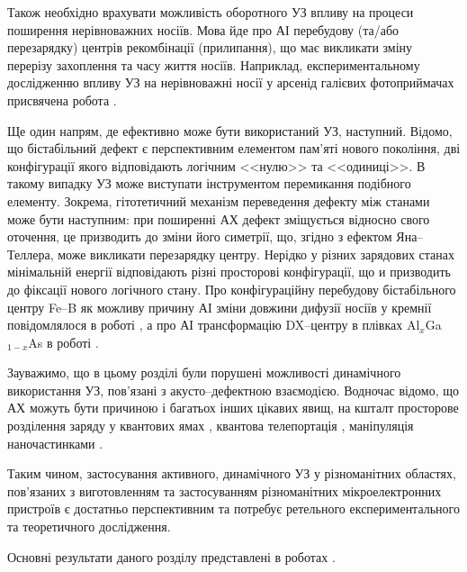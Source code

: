 Також необхідно врахувати можливість оборотного УЗ впливу на процеси поширення нерівноважних носіїв.
Мова йде про АІ перебудову (та/або перезарядку)  центрів рекомбінації (прилипання), що має викликати зміну перерізу захоплення та часу життя носіїв.
Наприклад, експериментальному дослідженню впливу УЗ на нерівноважні носії у арсенід галієвих фотоприймачах присвячена робота \cite{Zaveryukhin2002:2}.




Ще один напрям, де ефективно може бути використаний УЗ, наступний.
Відомо, що бістабільний дефект є перспективним елементом пам'яті нового покоління,
дві конфігурації якого відповідають логічним <<нулю>> та <<одиниці>>.
В такому випадку УЗ може виступати інструментом перемикання подібного елементу.
Зокрема, гітотетичний механізм переведення дефекту між станами може бути наступним:
при поширенні АХ дефект зміщується відносно свого оточення, це призводить до зміни його симетрії, що, згідно з ефектом Яна--Теллера, може викликати перезарядку центру.
Нерідко у різних зарядових станах мінімальній енергії відповідають різні просторові конфігурації, що и призводить до фіксації нового логічного стану.
Про конфігураційну перебудову бістабільного центру Fe--B як можливу причину АІ зміни довжини дифузії носіїв у кремнії повідомлялося в роботі \cite{OlikhFTT},
а про АІ трансформацію DX--центру в плівках Al$_x$Ga$_{1-x}$As в роботі \cite{belyaev1994}.

Зауважимо, що в цьому розділі були порушені можливості динамічного використання УЗ, пов'язані з акусто--дефектною взаємодією.
Водночас відомо, що АХ можуть бути причиною і багатьох інших цікавих явищ, на кшталт просторове розділення заряду у квантових ямах \cite{Kuryliuk2009}, квантова телепортація \cite{Buscemi}, маніпуляція наночастинками \cite{Cuberes,Olikh:SPQEO2010}.

Таким чином, застосування активного, динамічного УЗ у різноманітних областях, пов'язаних з виготовленням та застосуванням різноманітних мікроелектронних пристроїв є достатньо перспективним та потребує ретельного експериментального та теоретичного дослідження.







Основні результати даного розділу представлені в роботах \cite{Olikh:SEMT2004,Olikh:SEMT2011,1UNCPS,2013Buk}.

